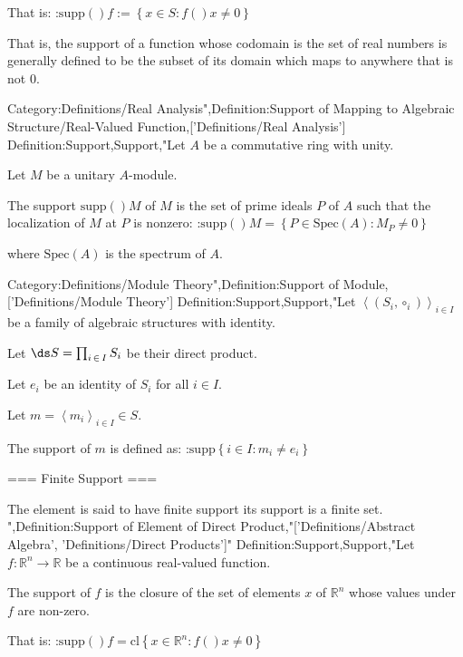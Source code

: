 That is:
:$\mathrm {supp} \left(   \right)f := \left\lbrace x \in S: f \left(   \right)x \ne 0 \right\rbrace$


That is, the support of a function whose codomain is the set of real numbers is generally defined to be the subset of its domain which maps to anywhere that is not $0$.

Category:Definitions/Real Analysis",Definition:Support of Mapping to Algebraic Structure/Real-Valued Function,['Definitions/Real Analysis']
Definition:Support,Support,"Let $A$ be a commutative ring with unity.

Let $M$ be a unitary $A$-module.


The support $\mathrm {supp} \left(   \right)M$ of $M$ is the set of prime ideals $P$ of $A$ such that the localization of $M$ at $P$ is nonzero:
:$\mathrm {supp} \left(   \right)M = \left\lbrace P \in \mathrm {Spec} \left( A \right) : M_P \ne 0 \right\rbrace$

where $\mathrm {Spec} \left( A \right)$ is the spectrum of $A$.

Category:Definitions/Module Theory",Definition:Support of Module,['Definitions/Module Theory']
Definition:Support,Support,"Let $\left\langle \left( S_i, \circ_i \right)  \right\rangle_{i \mathop \in I}$ be a family of algebraic structures with identity.

Let $\ds S = \prod_{i \mathop \in I} S_i$ be their direct product.

Let $e_i$ be an identity of $S_i$ for all $i \in I$.

Let $m = \left\langle m_i \right\rangle_{i \mathop \in I} \in S$.


The support of $m$ is defined as:
:$\mathrm {supp} \left\lbrace i \in I: m_i \ne e_i \right\rbrace$




=== Finite Support ===

The element is said to have finite support  its support is a finite set.
",Definition:Support of Element of Direct Product,"['Definitions/Abstract Algebra', 'Definitions/Direct Products']"
Definition:Support,Support,"Let $f: \mathbb R^n \to \mathbb R$ be a continuous real-valued function.

The support of $f$ is the closure of the set of elements $x$ of $\mathbb R^n$ whose values under $f$ are non-zero.

That is:
:$\mathrm {supp} \left(   \right)f = \mathrm {cl} \left\lbrace x \in \mathbb R^n: f \left(   \right)x \ne 0 \right\rbrace$


